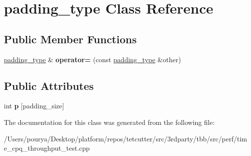 \hypertarget{classpadding__type}{}\section{padding\+\_\+type Class Reference}
\label{classpadding__type}
\subsection*{Public Member Functions}
\begin{DoxyCompactItemize}
\item 
\hypertarget{classpadding__type_ac2f877fef2d94445a32e0125c157c07e}{}\hyperlink{classpadding__type}{padding\+\_\+type} \& {\bfseries operator=} (const \hyperlink{classpadding__type}{padding\+\_\+type} \&other)\label{classpadding__type_ac2f877fef2d94445a32e0125c157c07e}

\end{DoxyCompactItemize}
\subsection*{Public Attributes}
\begin{DoxyCompactItemize}
\item 
\hypertarget{classpadding__type_a5aee461b13283003b338e9be4beb1da0}{}int {\bfseries p} \mbox{[}padding\+\_\+size\mbox{]}\label{classpadding__type_a5aee461b13283003b338e9be4beb1da0}

\end{DoxyCompactItemize}


The documentation for this class was generated from the following file\+:\begin{DoxyCompactItemize}
\item 
/\+Users/pourya/\+Desktop/platform/repos/tetcutter/src/3rdparty/tbb/src/perf/time\+\_\+cpq\+\_\+throughput\+\_\+test.\+cpp\end{DoxyCompactItemize}

